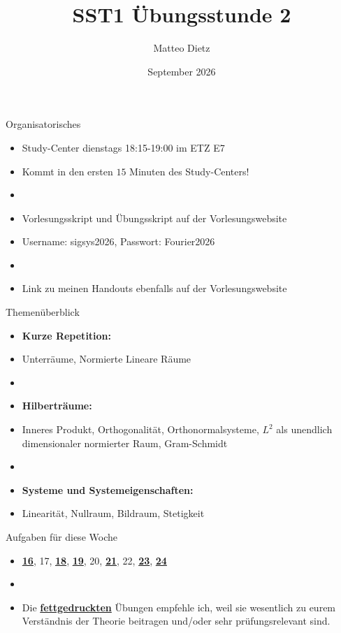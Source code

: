 \documentclass[14pt, aspectratio=169, handout]{beamer}
\title{SST1 Übungsstunde 2}
\author{Matteo Dietz}
\date{September 2026}
\begin{document}
\maketitle

\begin{frame}{Organisatorisches}
    \begin{itemize}
        \item \alert{Study-Center dienstags 18:15-19:00 im ETZ E7}
        \item[] Kommt in den ersten $15$ Minuten des Study-Centers!
        \item[]
        \item Vorlesungsskript und Übungsskript auf der Vorlesungswebsite
        \item[] Username: sigsys2026, \hspace{10pt} Passwort: Fourier2026
        \item[] 
        \item Link zu meinen Handouts ebenfalls auf der Vorlesungswebsite
    \end{itemize}
\end{frame}

\begin{frame}{Themenüberblick}
    \begin{itemize}
    \item \textbf{Kurze Repetition:}
    \item[] Unterräume, Normierte Lineare Räume
    \item[] 
    \item \textbf{Hilberträume:}
    \item[] Inneres Produkt, Orthogonalität, Orthonormalsysteme, $L^2$ als unendlich dimensionaler normierter Raum, Gram-Schmidt
    \item[] 
    \item \textbf{Systeme und Systemeigenschaften:}
    \item[] Linearität, Nullraum, Bildraum, Stetigkeit
\end{itemize}
\end{frame}

\begin{frame}{Aufgaben für diese Woche}
    \begin{itemize}
        \item[] \underline{\textbf{16}}, 17, \underline{\textbf{18}}, \underline{\textbf{19}}, 20, \underline{\textbf{21}}, 22, \underline{\textbf{23}}, \underline{\textbf{24}}
        \item[] 
        \item[] Die \underline{\textbf{fettgedruckten}} Übungen empfehle ich, weil sie wesentlich zu eurem Verständnis der Theorie beitragen und/oder sehr prüfungsrelevant sind.
    \end{itemize}
\end{frame}
\end{document}
